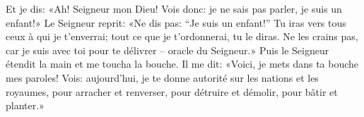 Et je dis: «Ah! Seigneur mon Dieu! Vois donc:
	je ne sais pas parler, je suis un enfant!»
Le Seigneur reprit: «Ne dis pas: “Je suis un enfant!”
	Tu iras vers tous ceux à qui je t’enverrai;
	tout ce que je t’ordonnerai, tu le diras.
Ne les crains pas, car je suis avec toi pour te délivrer – oracle du Seigneur.»
Puis le Seigneur étendit la main et me toucha la bouche.
Il me dit:
	«Voici, je mets dans ta bouche mes paroles!
	Vois: aujourd’hui, je te donne autorité sur les nations et les royaumes,
	pour arracher et renverser, pour détruire et démolir,
		pour bâtir et planter.»
